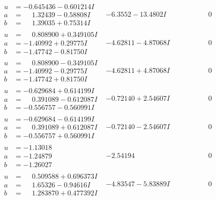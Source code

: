 \documentclass[1p]{elsarticle_modified}
\theoremstyle{definition}
\begin{document}
$$\begin{array}{c|c|c}
\begin{aligned}
u &= -0.645436 - 0.601214 I \\
a &= \phantom{-}1.32439 - 0.58808 I \\
b &= \phantom{-}1.39035 + 0.75314 I\end{aligned}
 & -6.3552 - 13.4802 I & \phantom{-0.000000 } 0 \\ \hline\begin{aligned}
u &= \phantom{-}0.808900 + 0.349105 I \\
a &= -1.40992 + 0.29775 I \\
b &= -1.47742 - 0.81750 I\end{aligned}
 & -4.62811 - 4.87068 I & \phantom{-0.000000 } 0 \\ \hline\begin{aligned}
u &= \phantom{-}0.808900 - 0.349105 I \\
a &= -1.40992 - 0.29775 I \\
b &= -1.47742 + 0.81750 I\end{aligned}
 & -4.62811 + 4.87068 I & \phantom{-0.000000 } 0 \\ \hline\begin{aligned}
u &= -0.629684 + 0.614199 I \\
a &= \phantom{-}0.391089 - 0.612087 I \\
b &= -0.556757 - 0.560991 I\end{aligned}
 & -0.72140 + 2.54607 I & \phantom{-0.000000 } 0 \\ \hline\begin{aligned}
u &= -0.629684 - 0.614199 I \\
a &= \phantom{-}0.391089 + 0.612087 I \\
b &= -0.556757 + 0.560991 I\end{aligned}
 & -0.72140 - 2.54607 I & \phantom{-0.000000 } 0 \\ \hline\begin{aligned}
u &= -1.13018\phantom{ +0.000000I} \\
a &= -1.24879\phantom{ +0.000000I} \\
b &= -1.26027\phantom{ +0.000000I}\end{aligned}
 & -2.54194\phantom{ +0.000000I} & \phantom{-0.000000 } 0 \\ \hline\begin{aligned}
u &= \phantom{-}0.509588 + 0.696373 I \\
a &= \phantom{-}1.65326 - 0.94616 I \\
b &= \phantom{-}1.283870 + 0.477392 I\end{aligned}
 & -4.83547 - 5.83889 I & \phantom{-0.000000 } 0 \\ \hline\begin{aligned}

\end{aligned}
\end{array}$$
\end{document}
